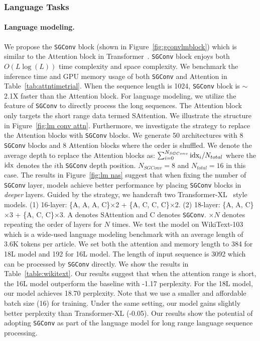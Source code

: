 \subsubsection{Language Tasks}\label{sec: lm}

\paragraph{Language modeling.} We propose the \texttt{SGConv} block (shown in Figure~\ref{fig:gconvlmblock}) which is similar to the Attention block in Transformer~\citep{vaswani2017attention}. \texttt{SGConv} block enjoys both $O(L\log(L))$ time complexity and space complexity. We benchmark the inference time and GPU memory usage of both \texttt{SGConv} and Attention in Table~\ref{tab:attntimetrial}. When the sequence length is 1024, \texttt{SGConv} block is $\sim$2.1X faster than the Attention block. For language modeling, we utilize the feature of \texttt{SGConv} to directly process the long sequences. The Attention block only targets the short range data termed SAttention. We illustrate the structure in Figure~\ref{fig:lm conv attn}. Furthermore, we investigate the strategy to replace the Attention blocks with \texttt{SGConv} blocks. We generate 50 architectures with 8 \texttt{SGConv} blocks and 8 Attention blocks where the order is shuffled. We denote the average depth to replace the Attention blocks as: $\sum_{i=0}^{N_{SGConv}} \textnormal{idx}_i/N_{total}$ where the $\textnormal{idx}$ denotes the $i$th \texttt{SGConv} depth position. $N_{SGConv}=8$ and $N_{total}=16$ in this case. The results in Figure~\ref{fig:lm nas} suggest that when fixing the number of \texttt{SGConv} layer, models achieve better performance by placing \texttt{SGConv} blocks in \emph{deeper} layers. Guided by the strategy, we handcraft two Transformer-XL~\citep{dai2019transformer} style models. (1) 16-layer: \{A, A, A, C\}$\times$2 + \{A, C, C, C\}$\times$2. (2) 18-layer: \{A, A, C\}$\times$3 + \{A, C, C\}$\times$3. A denotes SAttention and C denotes \texttt{SGConv}. $\times N$ denotes repeating the order of layers for $N$ times. We test the model on WikiText-103~\citep{merity2016pointer} which is a wide-used language modeling benchmark with an average length of 3.6K tokens per article. We set both the attention and memory length to 384 for 18L model and 192 for 16L model. The length of input sequence is 3092 which can be processed by \texttt{SGConv} directly. We show the results in Table~\ref{table:wikitext}. Our results suggest that when the attention range is short, the 16L model outperform the baseline with -1.17 perplexity. For the 18L model, our model achieves 18.70 perplexity. Note that we use a smaller and affordable batch size (16) for training. Under the same setting, our model gains slightly better perplexity than Transformer-XL (-0.05). Our results show the potential of adopting \texttt{SGConv} as part of the language model for long range language sequence processing. 

